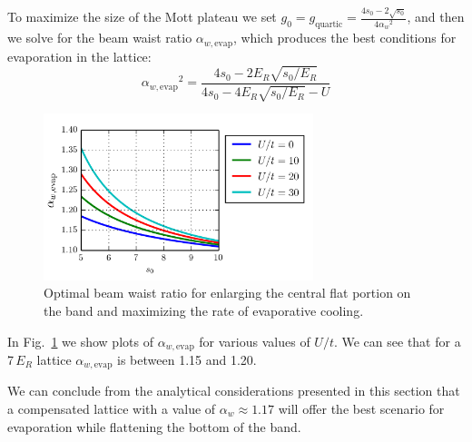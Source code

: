 \documentclass[11pt,letter]{article}
\newcommand{\awaist}{\ensuremath{ \alpha_{w} }}
\newcommand{\awaistevap}{\ensuremath{ \alpha_{w,\text{evap}} }}
\begin{document}
To maximize the size of the Mott plateau we set $g_{0} = g_{\text{quartic}} =
\frac{  4 s_{0} - 2 \sqrt{s_{0}} }{ 4 \awaist^{2} } $, and then we solve for
the beam waist ratio $\awaistevap$, which produces the best conditions for
evaporation in the lattice: 
\begin{equation}
 \awaistevap^{2} =  \frac{ 4 s_{0} - 2 E_{R} \sqrt{s_{0}/E_{R} }}
    { 4s_{0} - 4 E_{R} \sqrt{s_{0}/E_{R}}  - U }  
\end{equation} 
\begin{figure}
    \centering
\includegraphics[width=0.7\textwidth]{figures/alpha-evap-optimal.png}
\caption{Optimal beam waist ratio for enlarging the central flat portion on
the band and maximizing the rate of evaporative cooling. }
\label{fig:alpha-evap-optimal}
\end{figure}
In Fig.~\ref{fig:alpha-evap-optimal} we show plots of $\awaistevap$ for various
values of $U/t$.  We can see that for a 7\,$E_{R}$ lattice $\awaistevap$ is
between 1.15 and 1.20.  

We can conclude from the analytical considerations presented in this section
that a compensated lattice with a value of $\awaist \approx 1.17 $ will offer
the best scenario for evaporation while flattening the bottom of the band.  


\end{document}
